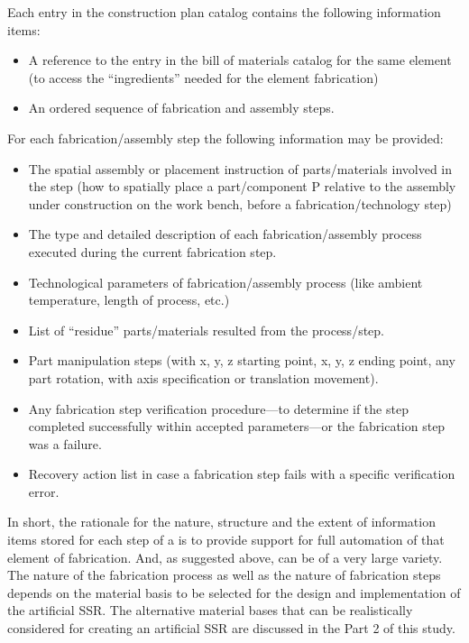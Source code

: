 Each entry in the construction plan catalog contains the following
information items:

\begin{itemize}
\item A reference to the entry in the bill of materials catalog for the
same element (to access the “ingredients” needed for the element
fabrication)
\item An ordered sequence of fabrication and assembly steps.
\end{itemize}

For each fabrication/assembly step the following information may be
provided:

\begin{itemize}
\item The spatial assembly or placement instruction of parts/materials
involved in the step (how to spatially place a part/component P
relative to the assembly under construction on the work bench, before a
fabrication/technology step)
\item The type and detailed description of each fabrication/assembly
process executed during the current fabrication step.
\item Technological parameters of fabrication/assembly process (like
ambient temperature, length of process, etc.)
\item List of “residue” parts/materials resulted from the process/step.
\item Part manipulation steps (with x, y, z starting point, x, y, z
ending point, any part rotation, with axis specification or translation
movement).
\item Any fabrication step verification procedure---to determine if the
step completed successfully within accepted parameters---or the
fabrication step was a failure.
\item Recovery action list in case a fabrication step fails with a
specific verification error.
\end{itemize}

In short, the rationale for the nature, structure and the extent of
information items stored for each step of a  
is to provide support for full automation of that element of
fabrication. And, as suggested above,  can be
of a very large variety. The nature of the fabrication process as well
as the nature of fabrication steps depends on the material basis to be
selected for the design and implementation of the artificial SSR. The
alternative material bases that can be realistically considered for
creating an artificial SSR are discussed in the Part 2 of this study.


